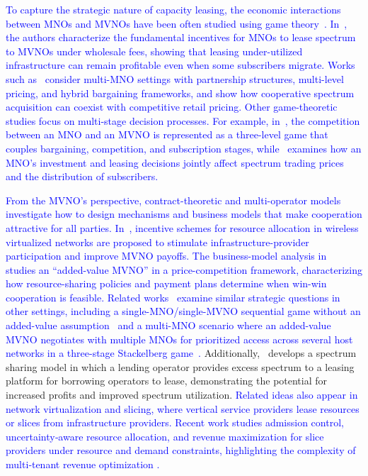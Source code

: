\documentclass[12pt, draftclsnofoot, onecolumn]{IEEEtran}
\begin{document}
	


\textcolor{blue}{To capture the strategic nature of capacity leasing, the economic interactions between MNOs and MVNOs have been often studied using game theory~\cite{Chen20-Part1,Sacoto20,BenKhalifa18,Chen20b}. In~\cite{Chen20-Part1}, the authors characterize the fundamental incentives for MNOs to lease spectrum to MVNOs under wholesale fees, showing that leasing under-utilized infrastructure can remain profitable even when some subscribers migrate. Works such as~\cite{Sacoto20,BenKhalifa18,Chen20b} consider multi-MNO settings with partnership structures, multi-level pricing, and hybrid bargaining frameworks, and show how cooperative spectrum acquisition can coexist with competitive retail pricing. Other game-theoretic studies focus on multi-stage decision processes. For example, in~\cite{Xiaowen19}, the competition between an MNO and an MVNO is represented as a three-level game that couples bargaining, competition, and subscription stages, while~\cite{Gao11} examines how an MNO’s investment and leasing decisions jointly affect spectrum trading prices and the distribution of subscribers.}

\textcolor{blue}{From the MVNO’s perspective, contract-theoretic and multi-operator models investigate how to design mechanisms and business models that make cooperation attractive for all parties. In~\cite{Chang2020}, incentive schemes for resource allocation in wireless virtualized networks are proposed to stimulate infrastructure-provider participation and improve MVNO payoffs. The business-model analysis in~\cite{Zhu19} studies an ``added-value MVNO'' in a price-competition framework, characterizing how resource-sharing policies and payment plans determine when win-win cooperation is feasible. Related works~\cite{Lotfi17,Zhu19_2} examine similar strategic questions in other settings, including a single-MNO/single-MVNO sequential game without an added-value assumption~\cite{Lotfi17} and a multi-MNO scenario where an added-value MVNO negotiates with multiple MNOs for prioritized access across several host networks in a three-stage Stackelberg game~\cite{Zhu19_2}.} Additionally,~\cite{Mohseni21} develops a spectrum sharing model in which a lending operator provides excess spectrum to a leasing platform for borrowing operators to lease, demonstrating the potential for increased profits and improved spectrum utilization.
\textcolor{blue}{Related ideas also appear in network virtualization and slicing, where vertical service providers lease resources or slices from infrastructure providers. Recent work studies admission control, uncertainty‑aware resource allocation, and revenue maximization for slice providers under resource and demand constraints, highlighting the complexity of multi‑tenant revenue optimization \cite{Dai23,Gholamipour22,Debbabi24,Fantacci20}.}
	
\end{document}
